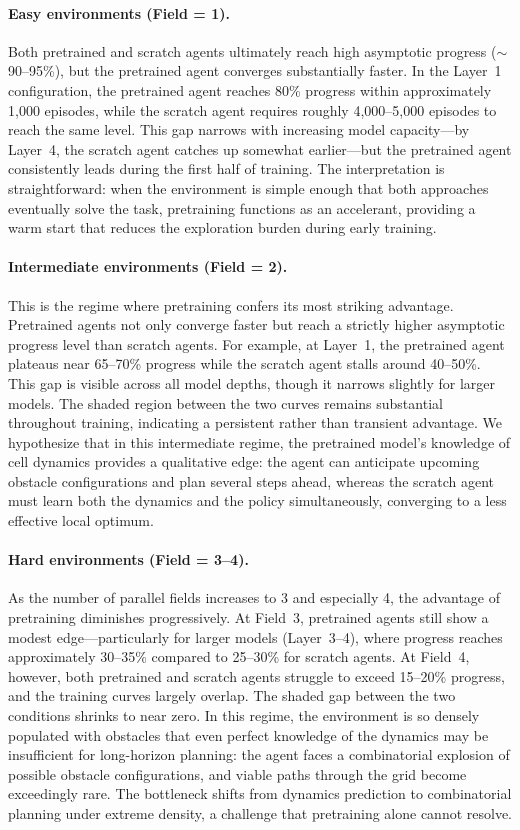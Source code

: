 \paragraph{Easy environments (Field = 1).}
Both pretrained and scratch agents ultimately reach high asymptotic progress (${\sim}$90--95\%), but the pretrained agent converges substantially faster. In the Layer~1 configuration, the pretrained agent reaches 80\% progress within approximately 1{,}000 episodes, while the scratch agent requires roughly 4{,}000--5{,}000 episodes to reach the same level. This gap narrows with increasing model capacity---by Layer~4, the scratch agent catches up somewhat earlier---but the pretrained agent consistently leads during the first half of training. The interpretation is straightforward: when the environment is simple enough that both approaches eventually solve the task, pretraining functions as an accelerant, providing a warm start that reduces the exploration burden during early training.

\paragraph{Intermediate environments (Field = 2).}
This is the regime where pretraining confers its most striking advantage. Pretrained agents not only converge faster but reach a strictly higher asymptotic progress level than scratch agents. For example, at Layer~1, the pretrained agent plateaus near 65--70\% progress while the scratch agent stalls around 40--50\%. This gap is visible across all model depths, though it narrows slightly for larger models. The shaded region between the two curves remains substantial throughout training, indicating a persistent rather than transient advantage. We hypothesize that in this intermediate regime, the pretrained model's knowledge of cell dynamics provides a qualitative edge: the agent can anticipate upcoming obstacle configurations and plan several steps ahead, whereas the scratch agent must learn both the dynamics and the policy simultaneously, converging to a less effective local optimum.

\paragraph{Hard environments (Field = 3--4).}
As the number of parallel fields increases to 3 and especially 4, the advantage of pretraining diminishes progressively. At Field~3, pretrained agents still show a modest edge---particularly for larger models (Layer~3--4), where progress reaches approximately 30--35\% compared to 25--30\% for scratch agents. At Field~4, however, both pretrained and scratch agents struggle to exceed 15--20\% progress, and the training curves largely overlap. The shaded gap between the two conditions shrinks to near zero. In this regime, the environment is so densely populated with obstacles that even perfect knowledge of the dynamics may be insufficient for long-horizon planning: the agent faces a combinatorial explosion of possible obstacle configurations, and viable paths through the grid become exceedingly rare. The bottleneck shifts from dynamics prediction to combinatorial planning under extreme density, a challenge that pretraining alone cannot resolve.

